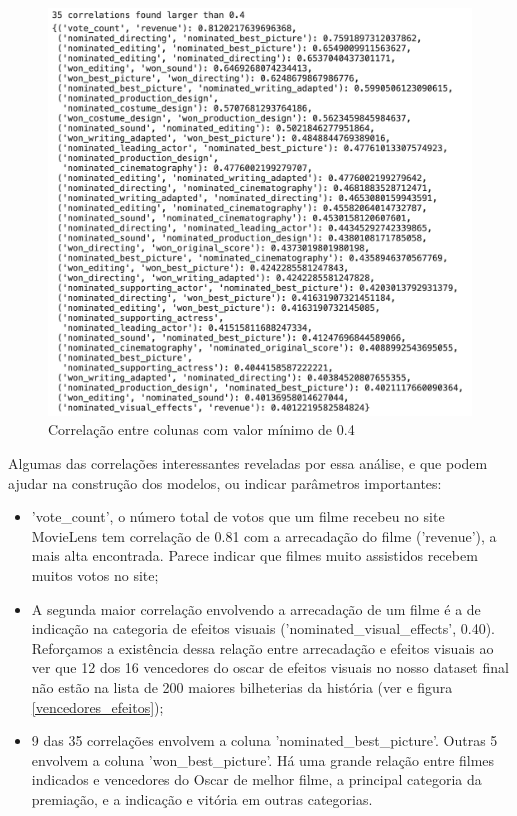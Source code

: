             \begin{figure}[htb]
            	\caption{\label{corrs0.4}Correlação entre colunas com valor mínimo de 0.4}
            	\begin{center}
            		\includegraphics[scale=0.7]{corrs0.4.png}
            	\end{center}
            \end{figure}

            Algumas das correlações interessantes reveladas por essa análise, e que podem ajudar na construção dos modelos, ou indicar parâmetros importantes:

            \begin{itemize}

            \item 'vote\_count', o número total de votos que um filme recebeu no site MovieLens tem correlação de 0.81 com a arrecadação do filme ('revenue'), a mais alta encontrada. Parece indicar que filmes muito assistidos recebem muitos votos no site;

            \item A segunda maior correlação envolvendo a arrecadação de um filme é a de indicação na categoria de efeitos visuais ('nominated\_visual\_effects', 0.40). Reforçamos a existência dessa relação entre arrecadação e efeitos visuais ao ver que 12 dos 16 vencedores do oscar de efeitos visuais no nosso dataset final não estão na lista de 200 maiores bilheterias da história (ver  e figura \ref{vencedores_efeitos});

            \item 9 das 35 correlações envolvem a coluna 'nominated\_best\_picture'. Outras 5 envolvem a coluna 'won\_best\_picture'. Há uma grande relação entre filmes indicados e vencedores do Oscar de melhor filme, a principal categoria da premiação, e a indicação e vitória em outras categorias.

            \end{itemize}

